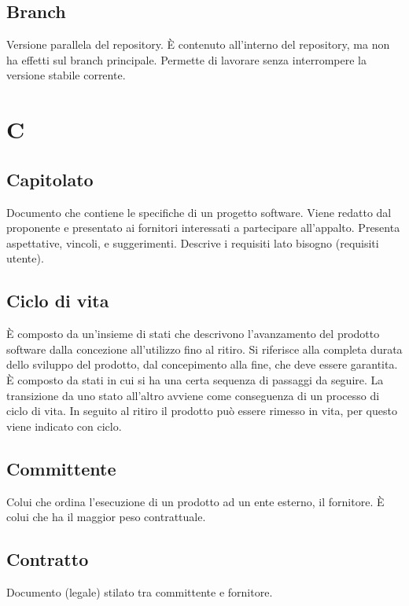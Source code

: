 \documentclass[a4paper,12pt]{article}
\begin{document}
\subsection*{Branch}
Versione parallela del repository. È contenuto all'interno del repository, ma non ha effetti sul branch principale. Permette di lavorare senza interrompere la versione stabile corrente.

\clearpage

\section{C}

\subsection*{Capitolato}
Documento che contiene le specifiche di un progetto software. Viene redatto dal proponente e presentato ai fornitori interessati a partecipare all'appalto.  
Presenta aspettative, vincoli, e suggerimenti. Descrive i requisiti lato bisogno (requisiti utente).

\subsection*{Ciclo di vita}
È composto da un'insieme di stati che descrivono l'avanzamento del prodotto software dalla concezione all'utilizzo fino al ritiro.
Si riferisce alla completa durata dello sviluppo del prodotto, dal concepimento alla fine, che deve essere garantita.  
È composto da stati in cui si ha una certa sequenza di passaggi da seguire. La transizione da uno stato all’altro avviene come conseguenza di un processo di ciclo di vita.  
In seguito al ritiro il prodotto può essere rimesso in vita, per questo viene indicato con ciclo.

\subsection*{Committente}
Colui che ordina l'esecuzione di un prodotto ad un ente esterno, il fornitore. È colui che ha il maggior peso contrattuale.

\subsection*{Contratto}
Documento (legale) stilato tra committente e fornitore.

\clearpage
\end{document}
